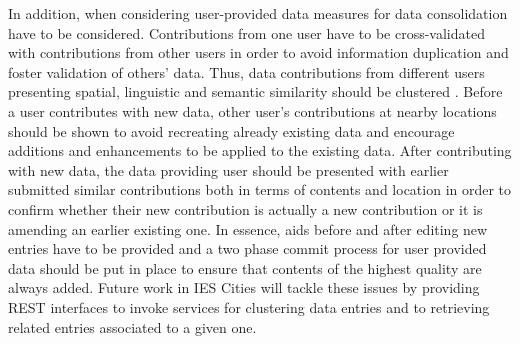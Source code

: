In addition, when considering user-provided data measures for data consolidation have to be considered. Contributions from one user have to be cross-validated with contributions from other users in order to avoid information duplication and foster validation of others' data. Thus, data contributions from different users presenting spatial, linguistic and semantic similarity should be clustered \cite{braun_collaborative_2010}. Before a user contributes with new data, other user's contributions at nearby locations should be shown to avoid recreating already existing data and encourage additions and enhancements to be applied to the existing data. After contributing with new data, the data providing user should be presented with earlier submitted similar contributions both in terms of contents and location in order to confirm whether their new contribution is actually a new contribution or it is amending an earlier existing one. In essence, aids before and after editing new entries have to be provided and a two phase commit process for user provided data should be put in place to ensure that contents of the highest quality are always added. Future work in IES Cities will tackle these issues by providing REST interfaces to invoke services for clustering data entries and to retrieving related entries associated to a given one.
